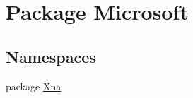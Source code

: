 \hypertarget{namespace_microsoft}{\section{Package Microsoft}
\label{namespace_microsoft}
}
\subsection*{Namespaces}
\begin{DoxyCompactItemize}
\item 
package \hyperlink{namespace_microsoft_1_1_xna}{Xna}
\end{DoxyCompactItemize}

